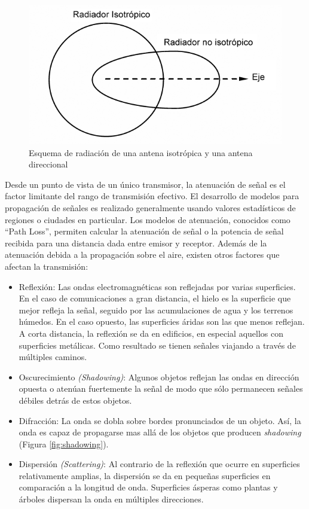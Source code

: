 \begin{figure}[!htp]
\centering
\includegraphics[scale=0.4]{images/isotropic_radiator.png}
\captionsetup{width=.6\linewidth}
\caption{Esquema de radiación de una antena isotrópica y una antena direccional}
\label{fig:antenna-pattern}
\end{figure}

Desde un punto de vista de un único transmisor, la atenuación de señal es el factor limitante del rango de transmisión efectivo\cite{schmidt2009degradation}. El desarrollo de modelos para propagación de señales es realizado generalmente usando valores estadísticos de regiones o ciudades en particular. Los modelos de atenuación, conocidos como ``Path Loss'', permiten calcular la atenuación de señal o la potencia de señal recibida para una distancia dada entre emisor y receptor. Además de la atenuación debida a la propagación sobre el aire, existen otros factores que afectan la transmisión:

\begin{itemize}
  \item Reflexión: Las ondas electromagnéticas son reflejadas por varias superficies. En el caso de comunicaciones a gran distancia, el hielo es la superficie que mejor refleja la señal, seguido por las acumulaciones de agua y los terrenos húmedos. En el caso opuesto, las superficies áridas son las que menos reflejan. A corta distancia, la reflexión se da en edificios, en especial aquellos con superficies metálicas. Como resultado se tienen señales viajando a través de múltiples caminos.
   \item Oscurecimiento \textit{(Shadowing)}: Algunos objetos reflejan las ondas en dirección opuesta o atenúan fuertemente la señal de modo que sólo permanecen señales débiles detrás de estos objetos.
   \item Difracción: La onda se dobla sobre bordes pronunciados de un objeto. Así, la onda es capaz de propagarse mas allá de los objetos que producen \textit{shadowing} (Figura \ref{fig:shadowing}).
   \item Dispersión \textit{(Scattering)}: Al contrario de la reflexión que ocurre en superficies relativamente amplias, la dispersión se da en pequeñas superficies en comparación a la longitud de onda. Superficies ásperas como plantas y árboles dispersan la onda en múltiples direcciones.
\end{itemize}

